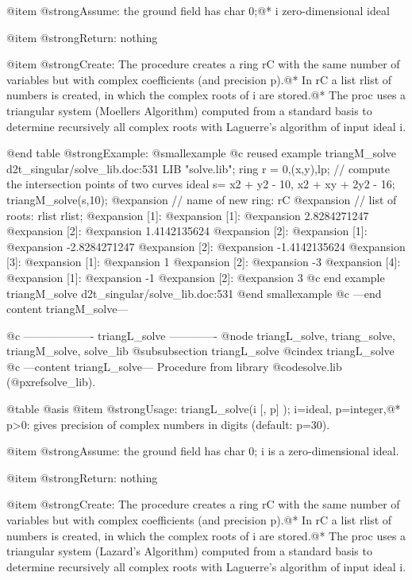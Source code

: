@item @strong{Assume:}
the ground field has char 0;@*
i zero-dimensional ideal

@item @strong{Return:}
nothing

@item @strong{Create:}
The procedure creates a ring rC with the same number of variables but
with complex coefficients (and precision p).@*
In rC a list rlist of numbers is created, in which the complex
roots of i are stored.@*
The proc uses a triangular system (Moellers Algorithm) computed from a
standard basis to determine recursively all complex roots with
Laguerre's algorithm of input ideal i.

@end table
@strong{Example:}
@smallexample
@c reused example triangM_solve d2t_singular/solve_lib.doc:531 
LIB "solve.lib";
ring r = 0,(x,y),lp;
// compute the intersection points of two curves
ideal s=  x2 + y2 - 10, x2 + xy + 2y2 - 16;
triangM_solve(s,10);
@expansion{} // name of new ring: rC
@expansion{} // list of roots: rlist
rlist;
@expansion{} [1]:
@expansion{}    [1]:
@expansion{}       2.8284271247
@expansion{}    [2]:
@expansion{}       1.4142135624
@expansion{} [2]:
@expansion{}    [1]:
@expansion{}       -2.8284271247
@expansion{}    [2]:
@expansion{}       -1.4142135624
@expansion{} [3]:
@expansion{}    [1]:
@expansion{}       1
@expansion{}    [2]:
@expansion{}       -3
@expansion{} [4]:
@expansion{}    [1]:
@expansion{}       -1
@expansion{}    [2]:
@expansion{}       3
@c end example triangM_solve d2t_singular/solve_lib.doc:531
@end smallexample
@c ---end content triangM_solve---

@c ------------------- triangL_solve -------------
@node triangL_solve, triang_solve, triangM_solve, solve_lib
@subsubsection triangL_solve
@cindex triangL_solve
@c ---content triangL_solve---
Procedure from library @code{solve.lib} (@pxref{solve_lib}).

@table @asis
@item @strong{Usage:}
triangL_solve(i [, p] ); i=ideal, p=integer,@*
p>0: gives precision of complex numbers in digits (default: p=30).

@item @strong{Assume:}
the ground field has char 0; i is a zero-dimensional ideal.

@item @strong{Return:}
nothing

@item @strong{Create:}
The procedure creates a ring rC with the same number of variables but
with complex coefficients (and precision p).@*
In rC a list rlist of numbers is created, in which the complex
roots of i are stored.@*
The proc uses a triangular system (Lazard's Algorithm) computed from
a standard basis to determine recursively all complex roots with
Laguerre's algorithm of input ideal i.

